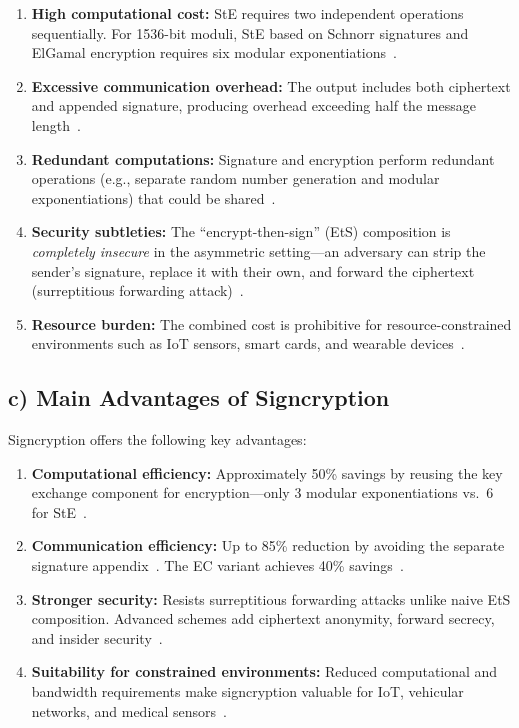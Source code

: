 \documentclass[11pt,a4paper]{article}
\begin{document}
\begin{enumerate}[label=\arabic*.]
    \item \textbf{High computational cost:} StE requires two independent operations sequentially. For 1536-bit moduli, StE based on Schnorr signatures and ElGamal encryption requires six modular exponentiations~\cite{zheng1997}.
    \item \textbf{Excessive communication overhead:} The output includes both ciphertext and appended signature, producing overhead exceeding half the message length~\cite{zheng1997}.
    \item \textbf{Redundant computations:} Signature and encryption perform redundant operations (e.g., separate random number generation and modular exponentiations) that could be shared~\cite{zheng1997}.
    \item \textbf{Security subtleties:} The ``encrypt-then-sign'' (EtS) composition is \textit{completely insecure} in the asymmetric setting---an adversary can strip the sender's signature, replace it with their own, and forward the ciphertext (surreptitious forwarding attack)~\cite{baek2002}.
    \item \textbf{Resource burden:} The combined cost is prohibitive for resource-constrained environments such as IoT sensors, smart cards, and wearable devices~\cite{zheng1998}.
\end{enumerate}

\subsection{c) Main Advantages of Signcryption}

Signcryption offers the following key advantages:

\begin{enumerate}[label=\arabic*.]
    \item \textbf{Computational efficiency:} Approximately 50\% savings by reusing the key exchange component for encryption---only 3 modular exponentiations vs.\ 6 for StE~\cite{zheng1997}.
    \item \textbf{Communication efficiency:} Up to 85\% reduction by avoiding the separate signature appendix~\cite{zheng1997}. The EC variant achieves 40\% savings~\cite{zheng1998}.
    \item \textbf{Stronger security:} Resists surreptitious forwarding attacks unlike naive EtS composition. Advanced schemes add ciphertext anonymity, forward secrecy, and insider security~\cite{boyen2003, badertscher2018}.
    \item \textbf{Suitability for constrained environments:} Reduced computational and bandwidth requirements make signcryption valuable for IoT, vehicular networks, and medical sensors~\cite{zheng1998, iotsigncryption2025}.
\end{enumerate}
\end{document}
